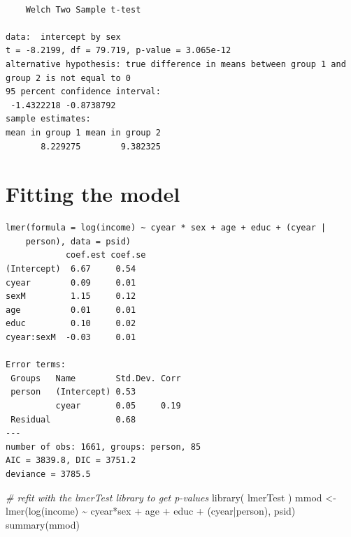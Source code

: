 \documentclass[
  letterpaper,
  DIV=11,
  numbers=noendperiod]{scrreprt}
\newenvironment{Shaded}{}{}
\newcommand{\CommentTok}[1]{\textcolor[rgb]{0.38,0.63,0.69}{\textit{#1}}}
\newcommand{\DecValTok}[1]{\textcolor[rgb]{0.25,0.63,0.44}{#1}}
\newcommand{\FunctionTok}[1]{\textcolor[rgb]{0.02,0.16,0.49}{#1}}
\newcommand{\NormalTok}[1]{#1}
\newcommand{\OtherTok}[1]{\textcolor[rgb]{0.00,0.44,0.13}{#1}}
\newcommand{\SpecialCharTok}[1]{\textcolor[rgb]{0.25,0.44,0.63}{#1}}
\begin{document}
\begin{verbatim}

    Welch Two Sample t-test

data:  intercept by sex
t = -8.2199, df = 79.719, p-value = 3.065e-12
alternative hypothesis: true difference in means between group 1 and group 2 is not equal to 0
95 percent confidence interval:
 -1.4322218 -0.8738792
sample estimates:
mean in group 1 mean in group 2 
       8.229275        9.382325 
\end{verbatim}

\section{Fitting the model}\label{fitting-the-model}

\begin{Shaded}
\end{Shaded}

\begin{verbatim}
lmer(formula = log(income) ~ cyear * sex + age + educ + (cyear | 
    person), data = psid)
            coef.est coef.se
(Intercept)  6.67     0.54  
cyear        0.09     0.01  
sexM         1.15     0.12  
age          0.01     0.01  
educ         0.10     0.02  
cyear:sexM  -0.03     0.01  

Error terms:
 Groups   Name        Std.Dev. Corr 
 person   (Intercept) 0.53          
          cyear       0.05     0.19 
 Residual             0.68          
---
number of obs: 1661, groups: person, 85
AIC = 3839.8, DIC = 3751.2
deviance = 3785.5 
\end{verbatim}

\begin{Shaded}
\begin{Highlighting}[]
\CommentTok{\# refit with the lmerTest library to get p{-}values}
\FunctionTok{library}\NormalTok{( lmerTest )}
\NormalTok{mmod }\OtherTok{\textless{}{-}} \FunctionTok{lmer}\NormalTok{(}\FunctionTok{log}\NormalTok{(income) }\SpecialCharTok{\textasciitilde{}}\NormalTok{ cyear}\SpecialCharTok{*}\NormalTok{sex }\SpecialCharTok{+}\NormalTok{ age }\SpecialCharTok{+}\NormalTok{ educ }\SpecialCharTok{+}\NormalTok{ (cyear}\SpecialCharTok{|}\NormalTok{person), psid)}
\FunctionTok{summary}\NormalTok{(mmod)}
\end{Highlighting}
\end{Shaded}
\end{document}
